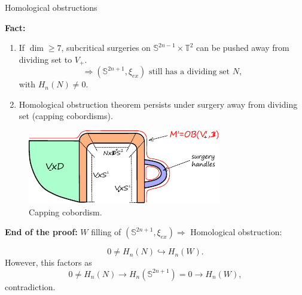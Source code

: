 \documentclass{beamer}
\begin{document}
\begin{frame}{Homological obstructions}

\textbf{Fact:} 

\begin{enumerate}
    \item If $\dim \geq 7$, subcritical surgeries on $\mathbb S^{2n-1}\times \mathbb T^2$ can be pushed away from dividing set to $V_+$.
$$
\Rightarrow (\mathbb S^{2n+1},\xi_{ex}) \mbox{ still has a dividing set } N,
$$
with $H_n(N)\neq 0$.

\pause 
\item Homological obstruction theorem persists under surgery away from dividing set (capping cobordisms).
\end{enumerate}


\begin{figure}
    \centering
    \includegraphics[width=0.68\linewidth]{blowdown_handle.pdf}
    \caption{Capping cobordism.}
    \label{fig:capping_cobordism}
\end{figure}

\end{frame}

\begin{frame}

\textbf{End of the proof:} $W$ filling of $(\mathbb S^{2n+1},\xi_{ex}) \Rightarrow$ Homological obstruction: 

$$
0\neq H_n(N) \hookrightarrow H_n(W).
$$
However, this factors as
$$
0\neq H_n(N) \rightarrow H_n(\mathbb S^{2n+1})=0 \rightarrow H_n(W),
$$
contradiction.
\end{frame}
\end{document}
